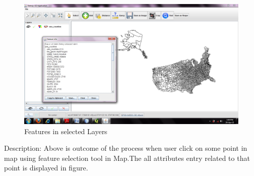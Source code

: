 \newpage
\begin{figure}[h]
\begin{center}
  \includegraphics[scale=0.43] {20.jpg}
  \caption[Screenshot - Feature Info]{Features in selected Layers}
\end{center}
\end{figure}
Description: Above is outcome of the process when user click on some point in map using feature selection tool in Map.The all attributes entry related to that point is displayed in figure.
